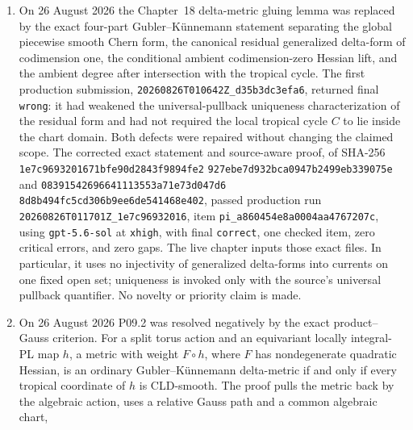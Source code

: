 \begin{enumerate}
  passed production run
  \texttt{20260825T145229Z\_b37e13478cc7}, item
  \texttt{pi\_10f6228b6e69e780dad8b17b}, using
  \texttt{gpt-5.6-sol} at \texttt{xhigh}, with final
  \texttt{correct}, one checked item, zero critical errors, and zero gaps.
  The exact files are included directly in Chapter~19.  P09.2 remains open
  only for ample symmetric cubical metrics in non-isotrivial mixed
  reduction; the inventory therefore remains at 17 problem environments
  and 57 atoms, with tier counts \(0,8,15,17,17\).  No novelty or priority
  claim is made.
\item On 26 August 2026 the Chapter~18 delta-metric gluing lemma was replaced
  by the exact four-part Gubler--K\"unnemann statement separating the global
  piecewise smooth Chern form, the canonical residual generalized delta-form
  of codimension one, the conditional ambient codimension-zero Hessian lift,
  and the ambient degree after intersection with the tropical cycle.  The
  first production submission,
  \texttt{20260826T010642Z\_d35b3dc3efa6}, returned final
  \texttt{wrong}: it had weakened the universal-pullback uniqueness
  characterization of the residual form and had not required the local
  tropical cycle \(C\) to lie inside the chart domain.  Both defects were
  repaired without changing the claimed scope.  The corrected exact
  statement and source-aware proof, of SHA-256
  \texttt{1e7c9693201671bfe90d2843f9894fe2}
  \allowbreak\texttt{927ebe7d932bca0947b2499eb339075e} and
  \texttt{08391542696641113553a71e73d047d6}
  \allowbreak\texttt{8d8b494fc5cd306b9ee6de541468e402}, passed production
  run \texttt{20260826T011701Z\_1e7c96932016}, item
  \texttt{pi\_a860454e8a0004aa4767207c}, using
  \texttt{gpt-5.6-sol} at \texttt{xhigh}, with final
  \texttt{correct}, one checked item, zero critical errors, and zero gaps.
  The live chapter inputs those exact files.  In particular, it uses no
  injectivity of generalized delta-forms into currents on one fixed open
  set; uniqueness is invoked only with the source's universal pullback
  quantifier.  No novelty or priority claim is made.
\item On 26 August 2026 P09.2 was resolved negatively by the exact
  product--Gauss criterion.  For a split torus action and an equivariant
  locally integral-PL map \(h\), a metric with weight
  \(F\circ h\), where \(F\) has nondegenerate quadratic Hessian, is an
  ordinary Gubler--K\"unnemann delta-metric if and only if every tropical
  coordinate of \(h\) is CLD-smooth.  The proof pulls the metric back by the
  algebraic action, uses a relative Gauss path and a common algebraic chart,

\end{enumerate}
